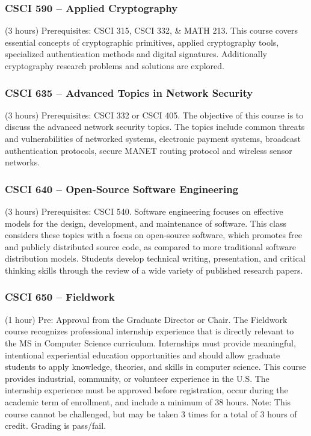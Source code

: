 \subsubsection{CSCI 590 -- Applied Cryptography}%
\label{course:CSCI:590}
(3 hours) Prerequisites:  CSCI 315, CSCI 332, \& MATH 213. This course covers essential concepts of cryptographic primitives, applied cryptography tools, specialized authentication methods and digital signatures. Additionally cryptography research problems and solutions are explored.

\subsubsection{CSCI 635 -- Advanced Topics in Network Security}%
\label{course:CSCI:635}
(3 hours) Prerequisites:  CSCI 332 or CSCI 405. The objective of this course is to discuss the advanced network security topics. The topics include common threats and vulnerabilities of networked systems, electronic payment systems, broadcast authentication protocols, secure MANET routing protocol and wireless sensor networks. 

\subsubsection{CSCI 640 -- Open-Source Software Engineering}%
\label{course:CSCI:640}
(3 hours) Prerequisites: CSCI 540. Software engineering focuses on effective models for the design, development, and maintenance of software. This class considers these topics with a focus on open-source software, which promotes free and publicly distributed source code, as compared to more traditional software distribution models. Students develop technical writing, presentation, and critical thinking skills through the review of a wide variety of published research papers.

\subsubsection{CSCI 650 -- Fieldwork}%
\label{course:CSCI:650}
(1 hour) Pre: Approval from the Graduate Director or Chair. The Fieldwork course recognizes professional internship experience that is directly relevant to the MS in Computer Science curriculum. Internships must provide meaningful, intentional experiential education opportunities and should allow graduate students to apply knowledge, theories, and skills in computer science. This course provides industrial, community, or volunteer experience in the U.S. The internship experience must be approved before registration, occur during the academic term of enrollment, and include a minimum of 38 hours. Note: This course cannot be challenged, but may be taken 3 times for a total of 3 hours of credit. Grading is pass/fail.

